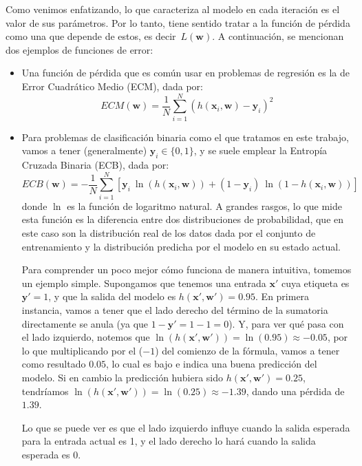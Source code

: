 \documentclass[../../main.tex]{subfiles}
\begin{document}
Como venimos enfatizando, lo que caracteriza al modelo en cada iteración es el valor de
sus parámetros. Por lo tanto, tiene sentido tratar a la función de pérdida como una que
depende de estos, es decir\footnotemark\ \(L(\bm{w})\). A continuación, se mencionan dos ejemplos de funciones de error:
\begin{itemize}
    \item Una función de pérdida que es común usar en problemas de regresión es la de
    Error Cuadrático Medio (ECM), dada por:
    \[
    ECM(\bm{w}) = \frac{1}{N} \sum_{i=1}^{N} \left(h(\bm{x}_i, \bm{w}) - \bm{y}_i\right)^2
    \]
    \item Para problemas de clasificación binaria como el que tratamos en este trabajo, vamos a tener
    (generalmente) \(\bm{y}_i \in \{0,1\}\), y se suele emplear la Entropía Cruzada Binaria (ECB), dada por:
    \[
    ECB(\bm{w}) = -\frac{1}{N} \sum_{i=1}^{N}
        \left[
            \bm{y}_i\ \ln(h(\bm{x}_i, \bm{w})) + (1 - \bm{y}_i)\ \ln(1 - h(\bm{x}_i, \bm{w}))
        \right]
    \]
    donde \(\ln\) es la función de logaritmo natural. A grandes rasgos, lo que mide esta
    función es la diferencia entre dos distribuciones de probabilidad, que en este caso
    son la distribución real de los datos dada por el conjunto de entrenamiento y la
    distribución predicha por el modelo en su estado actual.

    Para comprender un poco mejor cómo funciona de manera intuitiva, tomemos un ejemplo
    simple. Supongamos que tenemos una entrada \(\bm{x}'\) cuya etiqueta es \(\bm{y}'=1\),
    y que la salida del modelo es \(h(\bm{x}', \bm{w}') = 0{.}95\). En primera instancia,
    vamos a tener que el lado derecho del término de la sumatoria directamente se anula
    (ya que \(1-\bm{y}' = 1-1 = 0\)). Y, para ver qué pasa con el lado izquierdo, notemos
    que \(\ln(h(\bm{x}', \bm{w}')) = \ln(0{.}95) \approx -0{.}05\), por lo que multiplicando
    por el (\(-1\)) del comienzo de la fórmula, vamos a tener como resultado \(0{.}05\),
    lo cual es bajo e indica una buena predicción del modelo. Si en cambio la predicción
    hubiera sido \(h(\bm{x}', \bm{w}') = 0{.}25\), tendríamos \(\ln(h(\bm{x}', \bm{w}')) =
    \ln(0{.}25) \approx -1{.}39\), dando una pérdida de \(1{.}39\).

    Lo que se puede ver es que el lado izquierdo influye cuando la salida esperada para la
    entrada actual es 1, y el lado derecho lo hará cuando la salida esperada es 0.
\end{itemize}
\end{document}
